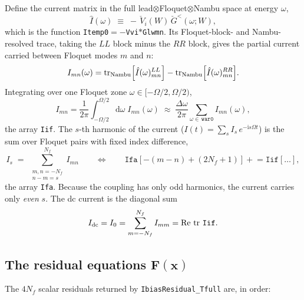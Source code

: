 \documentclass[11pt,a4paper]{article}
\newcommand{\dd}{\mathrm{d}}
\newcommand{\ii}{\mathrm{i}}
\newcommand{\tr}{\operatorname{tr}}
\newcommand{\Real}{\operatorname{Re}}
\begin{document}
Define the current matrix in the full lead$\otimes$Floquet$\otimes$Nambu space at
energy $\omega$,
\begin{equation}
  \hat I(\omega) \;\equiv\; -\,\check V_i(W)\,\check G^<(\omega;W),
  \label{eq:Ihat}
\end{equation}
which is the function \texttt{Itemp0}$=-$\texttt{Vvi}$*$\texttt{Glwmn}.  Its
Floquet-block- and Nambu-resolved trace, taking the $LL$ block minus the $RR$
block, gives the partial current carried between Floquet modes $m$ and $n$:
\begin{equation}
  I_{mn}(\omega) =
  \tr_{\rm Nambu}\!\Big[\hat I(\omega)^{LL}_{mn}\Big]
  -\tr_{\rm Nambu}\!\Big[\hat I(\omega)^{RR}_{mn}\Big].
  \label{eq:Imn_omega}
\end{equation}
Integrating over one Floquet zone $\omega\in[-\Omega/2,\Omega/2)$,
\begin{equation}
  I_{mn} = \frac{1}{2\pi}\int_{-\Omega/2}^{\Omega/2}\!\dd\omega\;I_{mn}(\omega)
         \;\approx\; \frac{\Delta\omega}{2\pi}\sum_{\omega\in\,\texttt{war0}} I_{mn}(\omega),
  \label{eq:Imn}
\end{equation}
the array \texttt{Iif}.  The $s$-th harmonic of the current
($I(t)=\sum_s I_s\,e^{-\ii s\Omega t}$) is the sum over Floquet pairs with fixed
index difference,
\begin{equation}
  I_s \;=\; \sum_{\substack{m,n=-N_f\\ n-m=s}}^{N_f} I_{mn}
  \qquad\Longleftrightarrow\qquad
  \texttt{Ifa}[-(m-n)+(2N_f{+}1)] \mathrel{+}= \texttt{Iif}[\dots],
  \label{eq:Is}
\end{equation}
the array \texttt{Ifa}.  Because the coupling has only odd harmonics, the current
carries only \emph{even} $s$.  The dc current is the diagonal sum
\begin{equation}
  I_{\rm dc} = I_0 = \sum_{m=-N_f}^{N_f} I_{mm} = \Real\,\tr\,\texttt{Iif}.
\end{equation}

\subsection{The residual equations $\mathbf F(\mathbf x)$}

The $4N_f$ scalar residuals returned by \texttt{IbiasResidual\_Tfull} are, in order:
\end{document}
